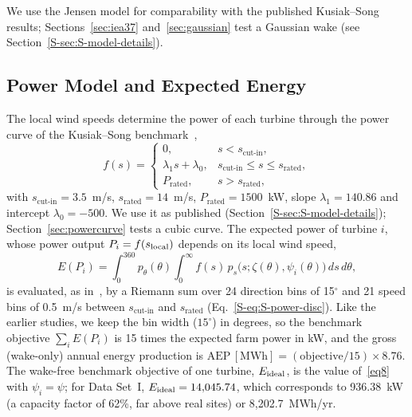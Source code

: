 We use the Jensen model for comparability with the published Kusiak--Song results; Sections~\ref{sec:iea37} and~\ref{sec:gaussian} test a Gaussian wake (see Section~\ref{S-sec:S-model-details}).

\subsection{Power Model and Expected Energy}
\label{sec:powermodel}
\label{sec:S-power}
The local wind speeds determine the power of each turbine through the power curve of the Kusiak--Song benchmark~\cite{Kusiak2010},
\begin{equation*}
f(s)=\begin{cases}
0, & s<s_{\text{cut-in}},\\
\lambda_1 s+\lambda_0, & s_{\text{cut-in}}\le s\le s_{\text{rated}},\\
P_{\text{rated}}, & s>s_{\text{rated}},
\end{cases}
\end{equation*}
with $s_{\text{cut-in}}=3.5$~m/s, $s_{\text{rated}}=14$~m/s, $P_{\text{rated}}=1500$~kW, slope $\lambda_1=140.86$ and intercept $\lambda_0=-500$. We use it as published (Section~\ref{S-sec:S-model-details}); Section~\ref{sec:powercurve} tests a cubic curve. The expected power of turbine $i$, whose power output $P_i=f(s_{\rm local})$ depends on its local wind speed,
\begin{equation}\label{eq8}
E(P_i) = \int_0^{360} p_\theta(\theta) \int_0^{\infty} f(s)\,
       p_s\bigl(s; \zeta(\theta), \psi_i(\theta)\bigr) \, ds \, d\theta ,
\end{equation}
is evaluated, as in~\cite{Kusiak2010}, by a Riemann sum over 24 direction bins of 15$^\circ$ and 21 speed bins of 0.5~m/s between $s_{\text{cut-in}}$ and $s_{\text{rated}}$ (Eq.~\eqref{S-eq:S-power-disc}).
Like the earlier studies, we keep the bin width ($15^\circ$) in degrees, so the benchmark objective $\sum_i E(P_i)$ is 15 times the expected farm power in kW, and the gross (wake-only) annual energy production is $\mathrm{AEP}\,[\mathrm{MWh}] = (\text{objective}/15)\times 8.76$. The wake-free benchmark objective of one turbine, $E_{\rm ideal}$, is the value of~\eqref{eq8} with $\psi_i=\psi$; for Data Set~I, $E_{\rm ideal}=14{,}045.74$, which corresponds to 936.38~kW (a capacity factor of 62\%, far above real sites) or 8,202.7~MWh/yr.

